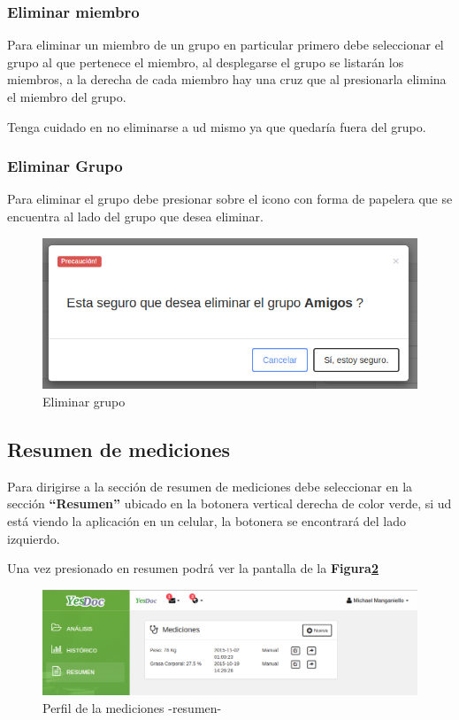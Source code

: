 \documentclass[a4paper,12pt]{article}
\begin{document}
\subsubsection{Eliminar miembro}
Para eliminar un miembro de un grupo en particular primero debe seleccionar el grupo al que pertenece el miembro, al desplegarse el grupo se listarán los miembros, a la derecha de cada miembro hay una cruz que al presionarla elimina el miembro del grupo.

Tenga cuidado en no eliminarse a ud mismo ya que quedaría fuera del grupo.

\subsubsection{Eliminar Grupo}

Para eliminar el grupo debe presionar sobre el icono con forma de papelera que se encuentra al lado del grupo que desea eliminar.
    \begin{figure}
    	\centering
    	\includegraphics[width=.8\textwidth]{img/manual_de_usuario/eliminar_grupo}
    	\caption{Eliminar grupo}
    	\label{mu-eliminar_grupo}
    \end{figure}
    
    
    
    
    
\subsection{Resumen de mediciones}    
Para dirigirse a la sección de resumen de mediciones debe seleccionar en la sección \textbf{``Resumen''} ubicado en la botonera vertical derecha de color verde, si ud está viendo la aplicación en un celular, la botonera se encontrará del lado izquierdo.

Una vez presionado en resumen podrá ver la pantalla de la \textbf{Figura\ref{mu-resumen_medicion}}
 

    \begin{figure}
    	\centering
    	\includegraphics[width=.8\textwidth]{img/manual_de_usuario/resumen_medicion}
    	\caption{Perfil de la mediciones -resumen-}
    	\label{mu-resumen_medicion}
    \end{figure}
\end{document}
